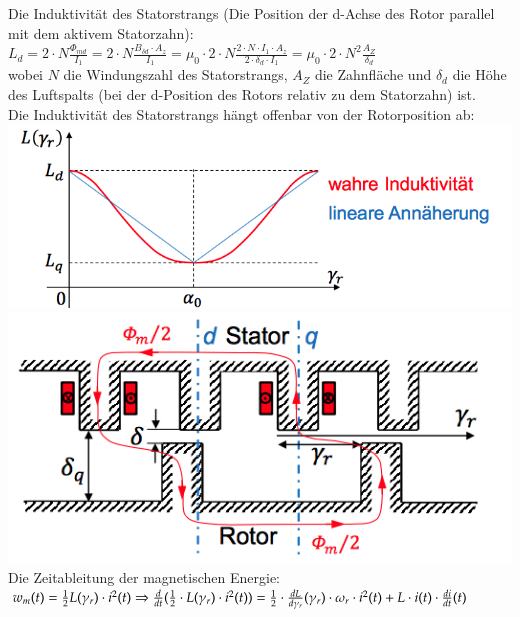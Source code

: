 \begin{minipage}{0.5 \linewidth}
Die Induktivität des Statorstrangs (Die Position der d-Achse des Rotor parallel mit dem aktivem Statorzahn): \\

$L_d = 2 \cdot N \frac{\Phi_{md}}{I_1} = 2 \cdot N \frac{B_{\delta d} \cdot A_z}{I_1} = \mu_0 \cdot 2 \cdot N \frac{2 \cdot N \cdot I_1 \cdot A_z}{2 \cdot \delta_d \cdot I_1} = \mu_0 \cdot 2 \cdot N^2 \frac{A_Z}{\delta_d}$ \\

wobei $N$ die Windungszahl des Statorstrangs, $A_Z$ die Zahnfläche und $\delta_d$ die Höhe des Luftspalts (bei der d-Position des Rotors relativ zu dem Statorzahn) ist. \\

Die Induktivität des Statorstrangs hängt offenbar von der Rotorposition ab: \\

\includegraphics[width = \linewidth]{./Pics/VL67/Drehmoment3} \\
\includegraphics[width = \linewidth]{./Pics/VL67/Drehmoment4} \\

Die Zeitableitung der magnetischen Energie: \\

$w_m(t) = \frac{1}{2} L(\gamma_r) \cdot i^2(t) \Rightarrow \frac{d}{dt}(\frac{1}{2}\cdot L(\gamma_r)\cdot i^2(t)) = \\
\frac{1}{2} \cdot \frac{dL}{d\gamma_r}(\gamma_r) \cdot \omega_r \cdot i^2(t) + L \cdot i(t) \cdot \frac{di}{dt}(t)$
\end{minipage}


